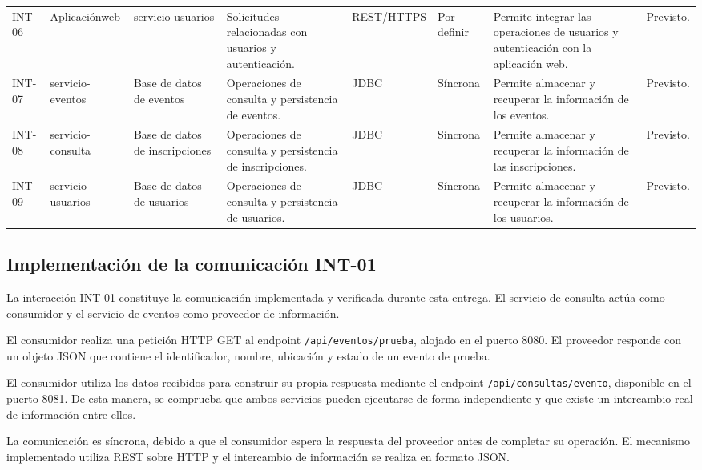 \begin{longtable}{
P{0.06\textwidth}
P{0.10\textwidth}
P{0.11\textwidth}
P{0.15\textwidth}
P{0.12\textwidth}
P{0.10\textwidth}
P{0.16\textwidth}
P{0.12\textwidth}
}
INT-06 &
Aplica\-ción\newline web &
servicio-\allowbreak usuarios &
Solicitudes relacionadas con usuarios y autenticación. &
REST/\allowbreak HTTPS &
Por definir &
Permite integrar las operaciones de usuarios y autenticación con la aplicación web. &
Previsto.\\

INT-07 &
servicio-\allowbreak eventos &
Base de datos de eventos &
Operaciones de consulta y persistencia de eventos. &
JDBC &
Síncrona &
Permite almacenar y recuperar la información de los eventos. &
Previsto.\\

INT-08 &
servicio-\allowbreak consulta &
Base de datos de inscripciones &
Operaciones de consulta y persistencia de inscripciones. &
JDBC &
Síncrona &
Permite almacenar y recuperar la información de las inscripciones. &
Previsto.\\

INT-09 &
servicio-\allowbreak usuarios &
Base de datos de usuarios &
Operaciones de consulta y persistencia de usuarios. &
JDBC &
Síncrona &
Permite almacenar y recuperar la información de los usuarios. &
Previsto.\\

\end{longtable}

\normalsize


\subsection{Implementación de la comunicación INT-01}

La interacción INT-01 constituye la comunicación implementada y verificada durante esta entrega. El servicio de consulta actúa como consumidor y el servicio de eventos como proveedor de información.

El consumidor realiza una petición HTTP GET al endpoint \texttt{/api/eventos/prueba}, alojado en el puerto 8080. El proveedor responde con un objeto JSON que contiene el identificador, nombre, ubicación y estado de un evento de prueba.

El consumidor utiliza los datos recibidos para construir su propia respuesta mediante el endpoint \texttt{/api/consultas/evento}, disponible en el puerto 8081. De esta manera, se comprueba que ambos servicios pueden ejecutarse de forma independiente y que existe un intercambio real de información entre ellos.

La comunicación es síncrona, debido a que el consumidor espera la respuesta del proveedor antes de completar su operación. El mecanismo implementado utiliza REST sobre HTTP y el intercambio de información se realiza en formato JSON.

